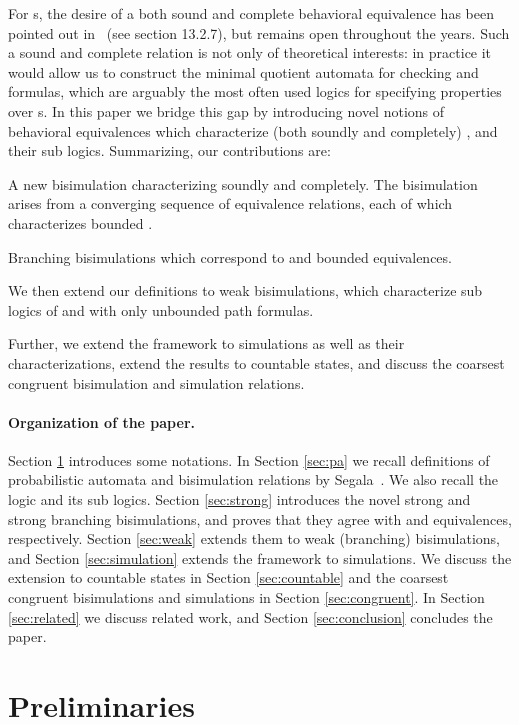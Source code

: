\documentclass{LMCS}
\begin{document}
For s, the desire of a both sound and complete behavioral
equivalence has been pointed out in~\cite{Segala-thesis} (see section
13.2.7), but remains open throughout the years.
Such a sound and complete relation is not only of theoretical interests: in practice
it would allow us to construct the minimal quotient automata for
checking  and  formulas, which are arguably the most often used
logics for specifying properties over s.
 In this paper we bridge this gap by introducing novel
notions of behavioral equivalences which characterize (both soundly
and completely) ,  and their sub logics.
Summarizing, our contributions are:
\begin{iteMize}{}
\item A new  bisimulation characterizing
 soundly and completely. The bisimulation arises from a converging sequence of equivalence relations, each of which characterizes bounded .
\item Branching bisimulations which correspond to  and bounded
   equivalences.
\item We then extend our definitions to weak bisimulations, which characterize sub logics of  and  with only unbounded path formulas.
\item Further, we extend the
  framework to simulations as well as their characterizations,
extend the results to countable states, and discuss the coarsest congruent bisimulation  and simulation relations.
\end{iteMize}

\paragraph{Organization of the paper.}
Section \ref{sec:pre} introduces some notations. In Section \ref{sec:pa} we recall definitions of probabilistic automata and bisimulation relations by Segala~\cite{Segala-thesis}. We also recall the logic  and its sub logics. Section \ref{sec:strong} introduces the novel strong and strong branching
bisimulations, and proves that they agree with  and 
equivalences, respectively. Section \ref{sec:weak}  extends them to weak
(branching) bisimulations, and Section \ref{sec:simulation} extends the framework to simulations. We discuss the extension to countable states in Section \ref{sec:countable} and the coarsest congruent bisimulations  and simulations in Section \ref{sec:congruent}. In Section \ref{sec:related} we discuss
related work, and Section \ref{sec:conclusion} concludes the paper.

\section{Preliminaries}\label{sec:pre}
\end{document}
